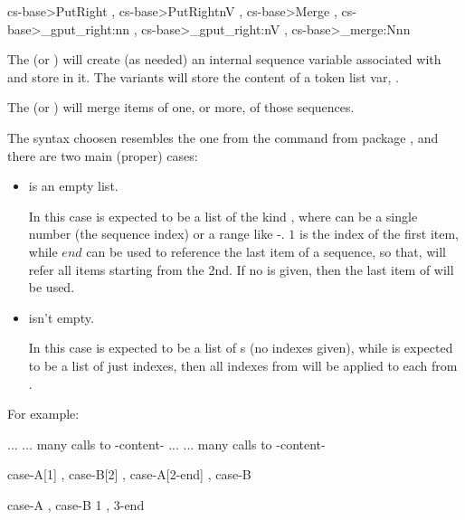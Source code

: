 \documentclass[10pt]{article}
\begin{document}
\begin{codedescribe}{\<cs-base>PutRight ,  \<cs-base>PutRightnV , \<cs-base>Merge , \<cs-base>_gput_right:nn ,  \<cs-base>_gput_right:nV , \<cs-base>_merge:Nnn }
\begin{codesyntax}%
\end{codesyntax}
The  (or ) will create (as needed) an internal sequence variable associated with  and store  in it. The  variants will store the content of a token list var, .

The  (or ) will merge items of one, or more, of those sequences.
\end{codedescribe}
 The syntax choosen resembles the one from the command \tsobj{\mergesc} from package , and there are two main (proper) cases:
 \begin{itemize}
   \item {} is an empty list. 
   
   In this case  is expected to be a list of the kind , where  can be a single number (the sequence index) or a range like -. $1$ is the index of the first item, while $end$ can be used to reference the last item of a sequence, so that, \tsverb[oarg]{[2-end]} will refer all items starting from the 2nd. If no  is given, then the last item of  will be used.
   
   \item {} isn't empty. 
   
   In this case  is expected to be a list of s (no indexes given), while  is expected to be a list of just indexes, then all indexes from  will be applied to each  from .
 \end{itemize}
For example:
\begin{codestore}
  ...
  ... many calls to  { -content- }
  ...
  ... many calls to  { -content- }
  
  \myStoreMerge { \tempA } { case-A[1] , case-B[2] , case-A[2-end] , case-B }

  \myStoreMerge { \tempB } { case-A , case-B } { 1 , 3-end }
\end{codestore}
\end{document}
